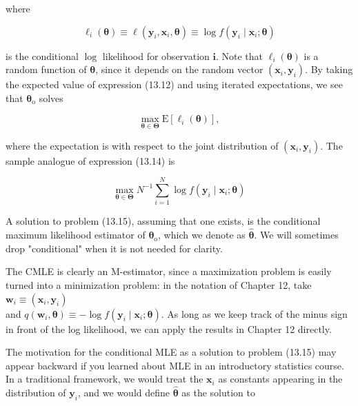 \documentclass[10pt]{article}
\begin{document}
where


\begin{equation*}
\ell_{i}(\boldsymbol{\theta}) \equiv \ell\left(\mathbf{y}_{i}, \mathbf{x}_{i}, \boldsymbol{\theta}\right) \equiv \log f\left(\mathbf{y}_{i} \mid \mathbf{x}_{i} ; \boldsymbol{\theta}\right) \tag{13.13}
\end{equation*}


is the conditional $\log$ likelihood for observation $\mathbf{i}$. Note that $\ell_{i}(\boldsymbol{\theta})$ is a random function of $\boldsymbol{\theta}$, since it depends on the random vector $\left(\mathbf{x}_{i}, \mathbf{y}_{i}\right)$. By taking the expected value of expression (13.12) and using iterated expectations, we see that $\boldsymbol{\theta}_{\mathrm{o}}$ solves


\begin{equation*}
\max _{\boldsymbol{\theta} \in \boldsymbol{\Theta}} \mathrm{E}\left[\ell_{i}(\boldsymbol{\theta})\right], \tag{13.14}
\end{equation*}


where the expectation is with respect to the joint distribution of $\left(\mathbf{x}_{i}, \mathbf{y}_{i}\right)$. The sample analogue of expression (13.14) is


\begin{equation*}
\max _{\boldsymbol{\theta} \in \boldsymbol{\Theta}} N^{-1} \sum_{i=1}^{N} \log f\left(\mathbf{y}_{i} \mid \mathbf{x}_{i} ; \boldsymbol{\theta}\right) \tag{13.15}
\end{equation*}


A solution to problem (13.15), assuming that one exists, is the conditional maximum likelihood estimator of $\boldsymbol{\theta}_{\mathrm{o}}$, which we denote as $\hat{\boldsymbol{\theta}}$. We will sometimes drop "conditional" when it is not needed for clarity.

The CMLE is clearly an M-estimator, since a maximization problem is easily turned into a minimization problem: in the notation of Chapter 12, take $\mathbf{w}_{i} \equiv\left(\mathbf{x}_{i}, \mathbf{y}_{i}\right)$\\
and $q\left(\mathbf{w}_{i}, \boldsymbol{\theta}\right) \equiv-\log f\left(\mathbf{y}_{i} \mid \mathbf{x}_{i} ; \boldsymbol{\theta}\right)$. As long as we keep track of the minus sign in front of the log likelihood, we can apply the results in Chapter 12 directly.

The motivation for the conditional MLE as a solution to problem (13.15) may appear backward if you learned about MLE in an introductory statistics course. In a traditional framework, we would treat the $\mathbf{x}_{i}$ as constants appearing in the distribution of $\mathbf{y}_{i}$, and we would define $\hat{\boldsymbol{\theta}}$ as the solution to
\end{document}
